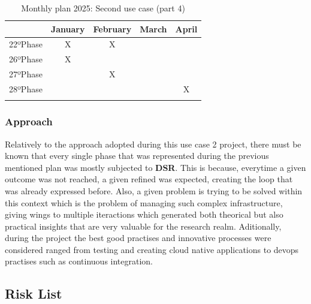 \begin{longtable}{| c | c | c | c | c |}
\hline
& \textbf{January} & \textbf{February} & \textbf{March} & \textbf{April}\\ \hline

    22ºPhase & X & X &  & \\ \hline
    
    26ºPhase & X &  &  & \\ \hline

    27ºPhase &  & X &  & \\ \hline

    28ºPhase &  &  &  & X \\ \hline
    \caption{Monthly plan 2025: Second use case (part 4)} \label{tab:activity_schedule} 
\end{longtable}

\subsubsection{Approach}
Relatively to the approach adopted during this use case 2 project, there must be known that every single phase that was represented during the previous mentioned plan was mostly subjected to \textbf{DSR}. This is because, everytime a given outcome was not reached, a given refined was expected, creating the loop that was already expressed before. Also, a given problem is trying to be solved within this context which is the problem of managing such complex infrastructure, giving wings to multiple iteractions which generated both theorical but also practical insights that are very valuable for the research realm. Aditionally, during the project the best good practises and innovative processes were considered ranged from testing and creating cloud native applications to devops practises such as continuous integration.

\subsection{Risk List}

